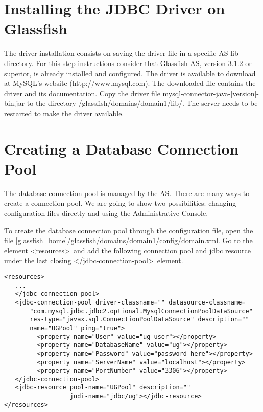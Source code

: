 \documentclass[envcountsame,envcountchap,letterpaper]{svmono}
\begin{document}
\section{Installing the JDBC Driver on Glassfish}

The driver installation consists on saving the driver file in a specific AS lib directory. For this step instructions consider that Glassfish AS, version 3.1.2 or superior, is already installed and configured. The driver is available to download at MySQL's website (http://www.mysql.com). The downloaded file contains the driver and its documentation. Copy  the driver file mysql-connector-java-[version]-bin.jar to the directory /glassfish/domains/domain1/lib/. The server needs to be restarted to make the driver available.

\section{Creating a Database Connection Pool}
\label{sec:creating-database-connection-pool}

The database connection pool is managed by the AS. There are many ways to create a connection pool. We are going to show two possibilities: changing configuration files directly and using the Administrative Console.

To create the database connection pool through the configuration file, open the file [glassfish\_home]/glassfish/domains/domain1/config/domain.xml. Go to the element \textless resources\textgreater \ and add the following connection pool and jdbc resource under the last closing \textless /jdbc-connection-pool\textgreater \ element.

\begin{verbatim}
<resources>
   ...
   </jdbc-connection-pool>
   <jdbc-connection-pool driver-classname="" datasource-classname=
       "com.mysql.jdbc.jdbc2.optional.MysqlConnectionPoolDataSource"
       res-type="javax.sql.ConnectionPoolDataSource" description="" 
       name="UGPool" ping="true">
         <property name="User" value="ug_user"></property>
         <property name="DatabaseName" value="ug"></property>
         <property name="Password" value="password_here"></property>
         <property name="ServerName" value="localhost"></property>
         <property name="PortNumber" value="3306"></property>
   </jdbc-connection-pool>
   <jdbc-resource pool-name="UGPool" description="" 
                  jndi-name="jdbc/ug"></jdbc-resource>
</resources>
\end{verbatim}
\end{document}
